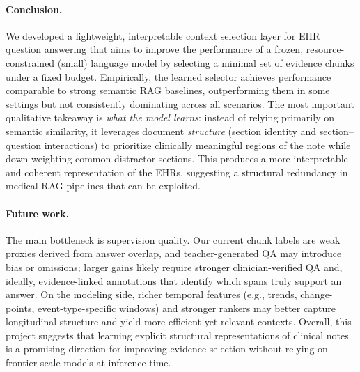 \paragraph{Conclusion.} We developed a lightweight, interpretable context selection layer for EHR question answering that aims to improve the performance of a frozen, resource-constrained (small) language model by selecting a minimal set of evidence chunks under a fixed budget. Empirically, the learned selector achieves performance comparable to strong semantic RAG baselines, outperforming them in some settings but not consistently dominating across all scenarios. The most important qualitative takeaway is \emph{what the model learns}: instead of relying primarily on semantic similarity, it leverages document \emph{structure} (section identity and section--question interactions) to prioritize clinically meaningful regions of the note while down-weighting common distractor sections. This produces a more interpretable and  coherent representation of the EHRs, suggesting a structural redundancy in medical RAG pipelines that can be exploited.

\paragraph{Future work.}
The main bottleneck is supervision quality. Our current chunk labels are weak proxies derived from answer overlap, and teacher-generated QA may introduce bias or omissions; larger gains likely require stronger clinician-verified QA and, ideally, evidence-linked annotations that identify which spans truly support an answer. On the modeling side, richer temporal features (e.g., trends, change-points, event-type-specific windows) and stronger rankers may better capture longitudinal structure and yield more efficient yet relevant contexts. Overall, this project suggests that learning explicit structural representations of clinical notes is a promising direction for improving evidence selection without relying on frontier-scale models at inference time.